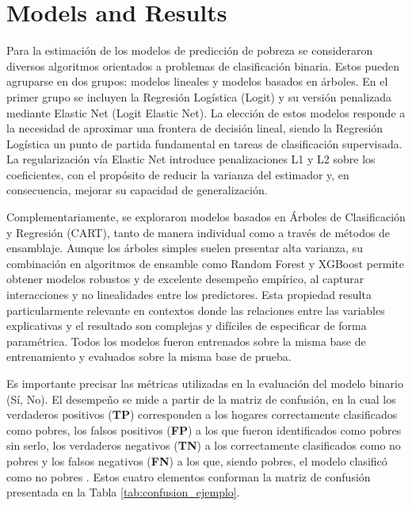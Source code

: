 

\section{Models and Results}
Para la estimación de los modelos de predicción de pobreza se consideraron diversos algoritmos orientados a problemas de clasificación binaria. Estos pueden agruparse en dos grupos: modelos lineales y modelos basados en árboles. En el primer grupo se incluyen la Regresión Logística (Logit) y su versión penalizada mediante Elastic Net (Logit Elastic Net). La elección de estos modelos responde a la necesidad de aproximar una frontera de decisión lineal, siendo la Regresión Logística un punto de partida fundamental en tareas de clasificación supervisada. La regularización vía Elastic Net introduce penalizaciones L1 y L2 sobre los coeficientes, con el propósito de reducir la varianza del estimador y, en consecuencia, mejorar su capacidad de generalización.

Complementariamente, se exploraron modelos basados en Árboles de Clasificación y Regresión (CART), tanto de manera individual como a través de métodos de ensamblaje. Aunque los árboles simples suelen presentar alta varianza, su combinación en algoritmos de ensamble como Random Forest y XGBoost permite obtener modelos robustos y de excelente desempeño empírico, al capturar interacciones y no linealidades entre los predictores. Esta propiedad resulta particularmente relevante en contextos donde las relaciones entre las variables explicativas y el resultado son complejas y difíciles de especificar de forma paramétrica. Todos los modelos fueron entrenados sobre la misma base de entrenamiento y evaluados sobre la misma base de prueba. 


Es importante precisar las métricas utilizadas en la evaluación del modelo binario (Sí, No). El desempeño se mide a partir de la matriz de confusión, en la cual los verdaderos positivos (\textbf{TP}) corresponden a los hogares correctamente clasificados como pobres, los falsos positivos (\textbf{FP}) a los que fueron identificados como pobres sin serlo, los verdaderos negativos (\textbf{TN}) a los correctamente clasificados como no pobres y los falsos negativos (\textbf{FN}) a los que, siendo pobres, el modelo clasificó como no pobres . Estos cuatro elementos conforman la matriz de confusión presentada en la Tabla \ref{tab:confusion_ejemplo}.



